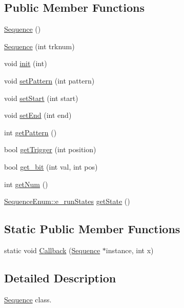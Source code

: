\subsection*{Public Member Functions}
\begin{DoxyCompactItemize}
\item 
\hyperlink{classSequence_a532b7e8df6ff6b2f990c14ae97859ca2}{Sequence} ()
\item 
\hyperlink{classSequence_aa46c51af61f19f47edbcb6865ec2eb21}{Sequence} (int trknum)
\item 
void \hyperlink{classSequence_a3866247a6a89a872514c3261b44c7e84}{init} (int)
\item 
void \hyperlink{classSequence_a4e4fe35ef98f961f64b6ff0fb0a6070b}{set\-Pattern} (int pattern)
\item 
void \hyperlink{classSequence_a63497de29b000ab800a9bfd862098010}{set\-Start} (int start)
\item 
void \hyperlink{classSequence_acd5fae49c72278d6d60ebb636f00a1b0}{set\-End} (int end)
\item 
int \hyperlink{classSequence_a0be7ca1c73194895111720e925e5f81c}{get\-Pattern} ()
\item 
bool \hyperlink{classSequence_ab400118246dd9437e1b4ea256bbdb626}{get\-Trigger} (int position)
\item 
bool \hyperlink{classSequence_a0aa238e326a703b831cf7dc5d873342b}{get\-\_\-bit} (int val, int pos)
\item 
int \hyperlink{classSequence_a5d749697a9eace5524ace54f323356bb}{get\-Num} ()
\item 
\hyperlink{namespaceSequenceEnum_ac7ea8369c971b81acfe5a1d63a10ebe3}{Sequence\-Enum\-::e\-\_\-run\-States} \hyperlink{classSequence_a45c5eaacd6489bc001ff5fd8d8dc8ff9}{get\-State} ()
\end{DoxyCompactItemize}
\subsection*{Static Public Member Functions}
\begin{DoxyCompactItemize}
\item 
static void \hyperlink{classSequence_ab155aaa37dda5a6e916afeb68a7e8edf}{Callback} (\hyperlink{classSequence}{Sequence} $\ast$instance, int x)
\end{DoxyCompactItemize}


\subsection{Detailed Description}
\hyperlink{classSequence}{Sequence} class. 

